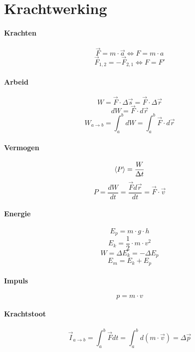 \section{Krachtwerking}
\label{sec:Krachtwerking}
  	\paragraph{Krachten}
		\label{sec:Krachten}
		  \[ \vec{F} = m \cdot \vec{a} \Leftrightarrow F = m \cdot a \]
		  \[ \vec{F}_{1,2} = - \vec{F}_{2,1} \Leftrightarrow F = F' \]
		\paragraph{Arbeid}
		\label{sec:Arbeid}
		  \[ W = \vec{F} \cdot \Delta\vec{s} = \vec{F} \cdot \Delta\vec{r}\]
		  \[ dW = \vec{F} \cdot d\vec{r} \]
		  \[ W_{a \to b} = \int_a^b {dW} = \int_a^b {\vec{F}\cdot d\vec{r}} \]
		\paragraph{Vermogen}
		\label{sec:Vermogen}
		  \[ \left< P \right> = \frac{W}{\Delta t} \]
		  \[ P = \frac{dW}{dt} = \frac{\vec{F}d\vec{r}}{dt} = \vec{F} \cdot \vec{v} \]
		\paragraph{Energie}
		\label{sec:Energie}
		  \[ E_p = m \cdot g \cdot h \]
		  \[ E_k = \frac{1}{2} \cdot m \cdot v^2 \]
		  \[ W = \Delta E_k  = - \Delta E_p\]
		  \[ E_m = E_k + E_p \]
		\paragraph{Impuls}
		\label{sec:Impuls}
		  \[ p = m \cdot v \]
		\paragraph{Krachtstoot}
		\label{sec:Krachtstoot}
      \[ \vec{I}_{a \to b} = \int_a^b \vec{F} dt = \int_a^b d\left(m\cdot \vec{v}\right) = \Delta \vec{p} \]